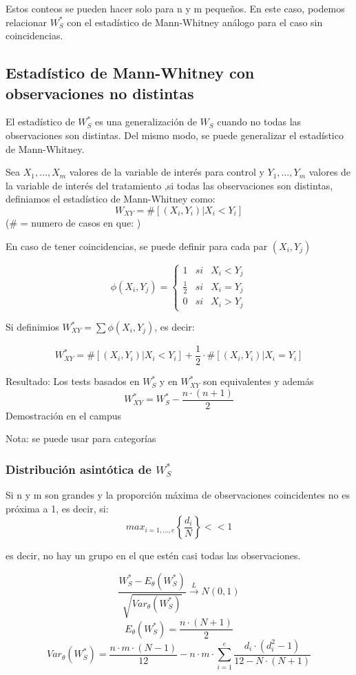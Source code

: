 Estos conteos se pueden hacer solo para n y m pequeños. En este caso, podemos relacionar $W_S^*$ con el estadístico de Mann-Whitney análogo para el caso sin coincidencias.

\subsection{Estadístico de Mann-Whitney con observaciones no distintas}

El estadístico de $W_S^*$ es una generalización de $W_S$ cuando no todas las observaciones son distintas.
Del mismo modo, se puede generalizar el estadístico de Mann-Whitney. 

Sea $X_1,\dots,X_m$ valores de la variable de interés para control y $Y_1,\dots,Y_m$ valores de la variable de interés del tratamiento
,si todas las observaciones son distintas, definiamos el estadístico de Mann-Whitney como:
\[
    W_{XY}= \# [(X_i,Y_i)|X_i<Y_i]
\]
($\#$ = numero de casos en que: )

En caso de tener coincidencias, se puede definir para cada par $(X_i,Y_j)$

\[
    \phi(X_i,Y_j)=\left\{ 
        \begin{matrix}
            1 & si & X_i<Y_j \\
            \frac{1}{2} & si & X_i=Y_j \\
            0 & si & X_i>Y_j
        \end{matrix}
    \right.
\]

Si definimios $W_{XY}^*=\sum \phi (X_i,Y_j)$, es decir:

\[
    W_{XY}^* = \# [(X_i,Y_i)|X_i<Y_i] + \frac{1}{2} \cdot \# [(X_i,Y_i)|X_i=Y_i]
\]

Resultado: Los tests basados en $W_S^*$ y en $W_{XY}^*$ son equivalentes y además
\[
    W_{XY}^*=W_S^*-\frac{n \cdot (n+1)}{2}
\]
Demostración en el campus

Nota: se puede usar para categorías
\newpage
\subsubsection{Distribución asintótica de $W_S^*$}

Si n y m son grandes y la proporción máxima de observaciones coincidentes no es próxima a 1, es decir, si:
\[
    max_{i=1,\dots,e}\left\{\frac{d_i}{N} \right\} << 1
\]

es decir, no hay un grupo en el que estén casi todas las observaciones.

\[
    \frac{W_S^*-E_\theta(W_S^*)}{\sqrt{Var_\theta(W_S^*)}} \xrightarrow{L} N(0,1)
\]
\[
    E_\theta(W_S^*)=\frac{n \cdot (N+1)}{2}
\]
\[
    Var_\theta(W_S^*)= \frac{n \cdot m \cdot (N-1)}{12}-n\cdot m \cdot \sum_{i=1}^{e} \frac{d_i \cdot (d_i^2-1)}{12-N \cdot (N+1)}
\]

